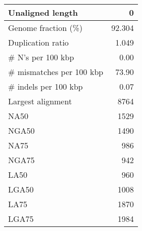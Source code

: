 \documentclass[12pt,a4paper]{article}
\begin{document}
\begin{table}[ht]
\begin{center}
\begin{tabular}{|l*{1}{|r}|}
Unaligned length & 0 \\ \hline
Genome fraction (\%) & 92.304 \\ \hline
Duplication ratio & 1.049 \\ \hline
\# N's per 100 kbp & 0.00 \\ \hline
\# mismatches per 100 kbp & 73.90 \\ \hline
\# indels per 100 kbp & 0.07 \\ \hline
Largest alignment & 8764 \\ \hline
NA50 & 1529 \\ \hline
NGA50 & 1490 \\ \hline
NA75 & 986 \\ \hline
NGA75 & 942 \\ \hline
LA50 & 960 \\ \hline
LGA50 & 1008 \\ \hline
LA75 & 1870 \\ \hline
LGA75 & 1984 \\ \hline
\end{tabular}
\end{center}
\end{table}
\end{document}
